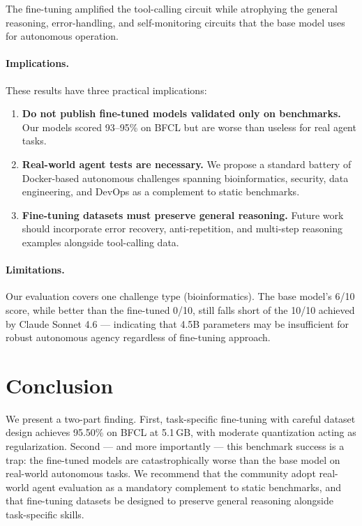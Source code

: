 \documentclass[11pt,a4paper]{article}
\begin{document}
The fine-tuning amplified the tool-calling circuit while atrophying the general reasoning, error-handling, and self-monitoring circuits that the base model uses for autonomous operation.

\paragraph{Implications.} These results have three practical implications:
\begin{enumerate}
\item \textbf{Do not publish fine-tuned models validated only on benchmarks.} Our models scored 93--95\% on BFCL but are worse than useless for real agent tasks.
\item \textbf{Real-world agent tests are necessary.} We propose a standard battery of Docker-based autonomous challenges spanning bioinformatics, security, data engineering, and DevOps as a complement to static benchmarks.
\item \textbf{Fine-tuning datasets must preserve general reasoning.} Future work should incorporate error recovery, anti-repetition, and multi-step reasoning examples alongside tool-calling data.
\end{enumerate}

\paragraph{Limitations.} Our evaluation covers one challenge type (bioinformatics). The base model's 6/10 score, while better than the fine-tuned 0/10, still falls short of the 10/10 achieved by Claude Sonnet 4.6 --- indicating that 4.5B parameters may be insufficient for robust autonomous agency regardless of fine-tuning approach.

\section{Conclusion}

We present a two-part finding. First, task-specific fine-tuning with careful dataset design achieves 95.50\% on BFCL at 5.1\,GB, with moderate quantization acting as regularization. Second --- and more importantly --- this benchmark success is a trap: the fine-tuned models are catastrophically worse than the base model on real-world autonomous tasks. We recommend that the community adopt real-world agent evaluation as a mandatory complement to static benchmarks, and that fine-tuning datasets be designed to preserve general reasoning alongside task-specific skills.
\end{document}
